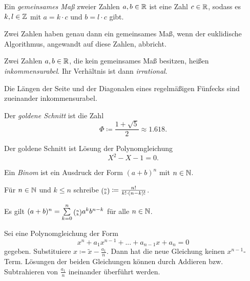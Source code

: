 \documentclass{cheat-sheet}
\let\myBinom\binom
\renewcommand{\binom}[2]{\mathsmaller{\myBinom{#1}{#2}}}
\begin{document}
\begin{defn}
  Ein \emph{gemeinsames Maß} zweier Zahlen $a, b \in \mathbb{R}$ ist eine Zahl $c \in \mathbb{R}$, sodass es $k, l \in \mathbb{Z}$ mit $a = k \cdot c$ und $b = l \cdot c$ gibt.
\end{defn}

\begin{bem}
  Zwei Zahlen haben genau dann ein gemeinsames Maß, wenn der euklidische Algorithmus, angewandt auf diese Zahlen, abbricht.
\end{bem}

\begin{defn}
  Zwei Zahlen $a, b \in \mathbb{R}$, die kein gemeinsames Maß besitzen, heißen \emph{inkommensurabel}. Ihr Verhältnis ist dann \emph{irrational}.
\end{defn}

\begin{satz}
  Die Längen der Seite und der Diagonalen eines regelmäßigen Fünfecks sind zueinander inkommensurabel.
\end{satz}

\begin{defn}
  Der \emph{goldene Schnitt} ist die Zahl
  \[ \Phi \coloneqq \frac{1 + \sqrt{5}}{2} \approx 1.618. \]
\end{defn}

\begin{bem}
  Der goldene Schnitt ist Lösung der Polynomgleichung
  \[ X^2 - X - 1 = 0. \]
\end{bem}



\begin{defn}
  Ein \emph{Binom} ist ein Ausdruck der Form $(a+b)^n$ mit $n \in \mathbb{N}$.
\end{defn}

\begin{defn}
  Für $n \in \mathbb{N}$ und $k \leq n$ schreibe $\binom{n}{k} \coloneqq \tfrac{n!}{k! \cdot (n-k)!}$.
\end{defn}

\begin{satz}
  Es gilt $(a+b)^n = \sum_{k=0}^n \binom{n}{k} a^k b^{n-k}$ für alle $n \in \mathbb{N}$.
\end{satz}


\begin{verf}
  Sei eine Polynomgleichung der Form
  \[ x^n + a_1 x^{n-1} + ... + a_{n-1} x + a_n = 0 \]
  gegeben. Substituiere $x \coloneqq \tilde{x} - \tfrac{a_1}{n}$. Dann hat die neue Gleichung keinen $x^{n-1}$-Term. Lösungen der beiden Gleichungen können durch Addieren bzw. Subtrahieren von $\tfrac{a_1}{n}$ ineinander überführt werden.
\end{verf}
\end{document}
